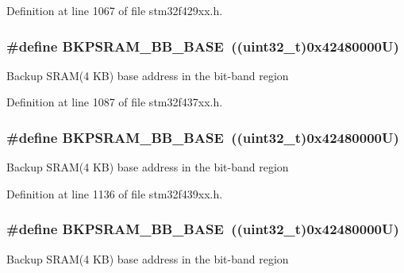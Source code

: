 Definition at line 1067 of file stm32f429xx.\+h.

\subsubsection[{\texorpdfstring{B\+K\+P\+S\+R\+A\+M\+\_\+\+B\+B\+\_\+\+B\+A\+SE}{BKPSRAM_BB_BASE}}]{\setlength{\rightskip}{0pt plus 5cm}\#define B\+K\+P\+S\+R\+A\+M\+\_\+\+B\+B\+\_\+\+B\+A\+SE~((uint32\+\_\+t)0x42480000\+U)}\hypertarget{group___peripheral__memory__map_gaee19a30c9fa326bb10b547e4eaf4e250}{}\label{group___peripheral__memory__map_gaee19a30c9fa326bb10b547e4eaf4e250}
Backup S\+R\+A\+M(4 K\+B) base address in the bit-\/band region 

Definition at line 1087 of file stm32f437xx.\+h.

\subsubsection[{\texorpdfstring{B\+K\+P\+S\+R\+A\+M\+\_\+\+B\+B\+\_\+\+B\+A\+SE}{BKPSRAM_BB_BASE}}]{\setlength{\rightskip}{0pt plus 5cm}\#define B\+K\+P\+S\+R\+A\+M\+\_\+\+B\+B\+\_\+\+B\+A\+SE~((uint32\+\_\+t)0x42480000\+U)}\hypertarget{group___peripheral__memory__map_gaee19a30c9fa326bb10b547e4eaf4e250}{}\label{group___peripheral__memory__map_gaee19a30c9fa326bb10b547e4eaf4e250}
Backup S\+R\+A\+M(4 K\+B) base address in the bit-\/band region 

Definition at line 1136 of file stm32f439xx.\+h.

\subsubsection[{\texorpdfstring{B\+K\+P\+S\+R\+A\+M\+\_\+\+B\+B\+\_\+\+B\+A\+SE}{BKPSRAM_BB_BASE}}]{\setlength{\rightskip}{0pt plus 5cm}\#define B\+K\+P\+S\+R\+A\+M\+\_\+\+B\+B\+\_\+\+B\+A\+SE~((uint32\+\_\+t)0x42480000\+U)}\hypertarget{group___peripheral__memory__map_gaee19a30c9fa326bb10b547e4eaf4e250}{}\label{group___peripheral__memory__map_gaee19a30c9fa326bb10b547e4eaf4e250}
Backup S\+R\+A\+M(4 K\+B) base address in the bit-\/band region 

